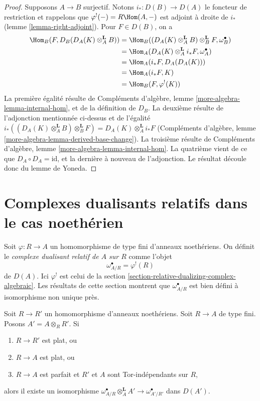 \begin{proof}
\medskip\noindent
Supposons $A \to B$ surjectif. Notons $i_* : D(B) \to D(A)$ le foncteur de restriction
et rappelons que $\varphi^!(-) = R\Hom(A, -)$ est adjoint à droite de $i_*$ (lemme \ref{lemma-right-adjoint}).
Pour $F \in D(B)$, on a
\begin{align*}
\Hom_B(F, D_B(D_A(K) \otimes_A^\mathbf{L} B))
& =
\Hom_B((D_A(K) \otimes_A^\mathbf{L} B) \otimes_B^\mathbf{L} F,
\omega_B^\bullet) \\
& =
\Hom_A(D_A(K) \otimes_A^\mathbf{L} i_*F, \omega_A^\bullet) \\
& =
\Hom_A(i_*F, D_A(D_A(K))) \\
& =
\Hom_A(i_*F, K) \\
& =
\Hom_B(F, \varphi^!(K))
\end{align*}
La première égalité résulte de Compléments d'algèbre, lemme \ref{more-algebra-lemma-internal-hom},
et de la définition de $D_B$.
La deuxième résulte de l'adjonction mentionnée ci-dessus et de l'égalité
$i_*((D_A(K) \otimes_A^\mathbf{L} B) \otimes_B^\mathbf{L} F) =
D_A(K) \otimes_A^\mathbf{L} i_*F$
(Compléments d'algèbre, lemme \ref{more-algebra-lemma-derived-base-change}).
La troisième résulte de Compléments d'algèbre, lemme \ref{more-algebra-lemma-internal-hom}.
La quatrième vient de ce que $D_A \circ D_A = \text{id}$, et la dernière à nouveau de l'adjonction.
Le résultat découle donc du lemme de Yoneda.
\end{proof}






\section{Complexes dualisants relatifs dans le cas noethérien}
\label{section-relative-dualizing-complexes-Noetherian}

\noindent
Soit $\varphi : R \to A$ un homomorphisme de type fini d'anneaux noethériens.
On définit le {\it complexe dualisant relatif de $A$ sur $R$}
comme l'objet
$$
\omega_{A/R}^\bullet = \varphi^!(R)
$$
de $D(A)$. Ici $\varphi^!$ est celui de la section \ref{section-relative-dualizing-complex-algebraic}.
Les résultats de cette section montrent que $\omega_{A/R}^\bullet$
est bien défini à isomorphisme non unique près.

\begin{lemma}
\label{lemma-base-change-relative-algebraic}
Soit $R \to R'$ un homomorphisme d'anneaux noethériens.
Soit $R \to A$ de type fini. Posons $A' = A \otimes_R R'$. Si
\begin{enumerate}
\item $R \to R'$ est plat, ou
\item $R \to A$ est plat, ou
\item $R \to A$ est parfait et $R'$ et $A$ sont Tor-indépendants sur $R$,
\end{enumerate}
alors il existe un isomorphisme
$\omega_{A/R}^\bullet \otimes_A^\mathbf{L} A' \to \omega^\bullet_{A'/R'}$
dans $D(A')$.
\end{lemma}


